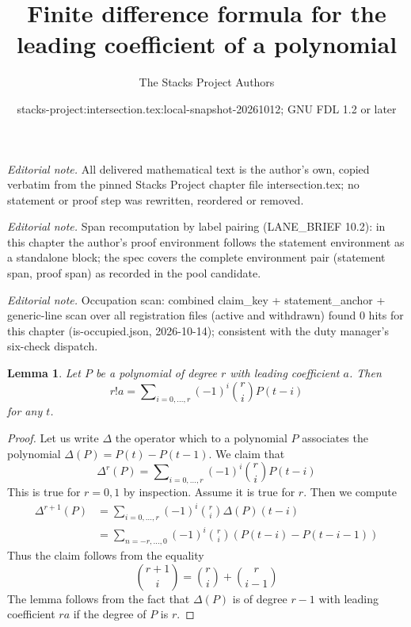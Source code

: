\documentclass[10pt,a4paper]{amsart}
\title{Finite difference formula for the leading coefficient of a polynomial}
\author{The Stacks Project Authors}
\date{stacks-project:intersection.tex:local-snapshot-20261012; GNU FDL 1.2 or later}
\theoremstyle{plain}
\newtheorem{lemma}[subsection]{Lemma}
\theoremstyle{definition}
\theoremstyle{remark}
\numberwithin{equation}{subsection}
\begin{document}
\maketitle
\noindent\textit{Editorial note.} All delivered mathematical text is the author's own, copied verbatim from the pinned Stacks Project chapter file intersection.tex; no statement or proof step was rewritten, reordered or removed.\par\medskip
\noindent\textit{Editorial note.} Span recomputation by label pairing (LANE\_BRIEF 10.2): in this chapter the author's proof environment follows the statement environment as a standalone block; the spec covers the complete environment pair (statement span, proof span) as recorded in the pool candidate.\par\medskip
\noindent\textit{Editorial note.} Occupation scan: combined claim\_key + statement\_anchor + generic-line scan over all registration files (active and withdrawn) found 0 hits for this chapter (is-occupied.json, 2026-10-14); consistent with the duty manager's six-check dispatch.\par\medskip
\begin{lemma}
\label{lemma-leading-coefficient}
Let $P$ be a polynomial of degree $r$ with leading coefficient $a$.
Then
$$
r! a = \sum\nolimits_{i = 0, \ldots, r} (-1)^i{r \choose i} P(t - i)
$$
for any $t$.
\end{lemma}

\begin{proof}
Let us write $\Delta$ the operator which to a polynomial $P$ associates
the polynomial $\Delta(P) = P(t) - P(t - 1)$. We claim that
$$
\Delta^r(P) = \sum\nolimits_{i = 0, \ldots, r} (-1)^i {r \choose i} P(t - i)
$$
This is true for $r = 0, 1$ by inspection. Assume it is true for $r$.
Then we compute
\begin{align*}
\Delta^{r + 1}(P)
& =
\sum\nolimits_{i = 0, \ldots, r} (-1)^i {r \choose i} \Delta(P)(t - i) \\
& =
\sum\nolimits_{n = -r, \ldots, 0} (-1)^i {r \choose i}
(P(t - i) - P(t - i - 1))
\end{align*}
Thus the claim follows from the equality
$$
{r + 1 \choose i} = {r \choose i} + {r \choose i - 1}
$$
The lemma follows from the fact that $\Delta(P)$ is of degree $r - 1$
with leading coefficient $ra$ if the degree of $P$ is $r$.
\end{proof}
\end{document}
